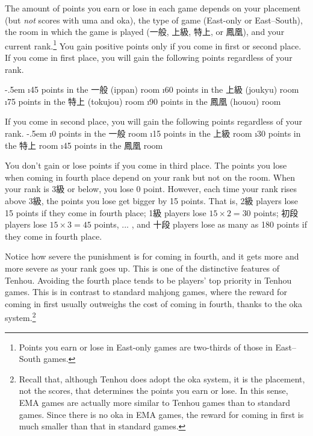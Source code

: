 The amount of points you earn or lose in each game depends on your placement (but \emph{not} scores with {\jap uma} and {\jap oka}), the type of game (East-only or East--South), the room in which the game is played (一般, 上級, 特上, or 鳳凰), and your current rank.\footnote{Points you earn or lose in East-only games are two-thirds of those in East--South games.} 
You gain positive points only if you come in first or second place. 
If you come in first place, you will gain the following points regardless of your rank.

\bi \itemsep-.5em
	\i 45 points in the 一般 ({\jap ippan}) room
	\i 60 points in the 上級 ({\jap joukyu}) room
	\i 75 points in the 特上 ({\jap tokujou}) room
	\i 90 points in the 鳳凰 ({\jap houou}) room
\ei

If you come in second place, you will gain the following points regardless of your rank.
	\bi \itemsep-.5em
	\i 0 points in the 一般 room
	\i 15 points in the 上級 room
	\i 30 points in the 特上 room
	\i 45 points in the 鳳凰 room
\ei

You don't gain or lose points if you come in third place. 
The points you lose when coming in fourth place depend on your rank but not on the room. When your rank is 3級 or below, you lose 0 point. However, each time your rank rises above 3級, the points you lose get bigger by 15 points. 
That is, 2級 players lose 15 points if they come in fourth place; 1級 players lose $15 \times 2 = 30$ points; 初段 players lose $15 \times 3 = 45$ points, ... , and 十段 players lose as many as 180 points if they come in fourth place.

\bigskip
Notice how severe the punishment is for coming in fourth, and it gets more and more severe as your rank goes up. This is one of the distinctive features of {\jap Tenhou}. 
Avoiding the fourth place tends to be players' top priority in {\jap Tenhou} games. This is in contrast to standard mahjong games, where the reward for coming in first usually outweighs the cost of coming in fourth, thanks to the {\jap oka} system.\footnote{Recall that, although {\jap Tenhou} does adopt the {\jap oka} system, it is the placement, not the scores, that determines the points you earn or lose. In this sense, EMA games are actually more similar to {\jap Tenhou} games than to standard games. Since there is no {\jap oka} in EMA games, the reward for coming in first is much smaller than that in standard games.} 

\bigskip

